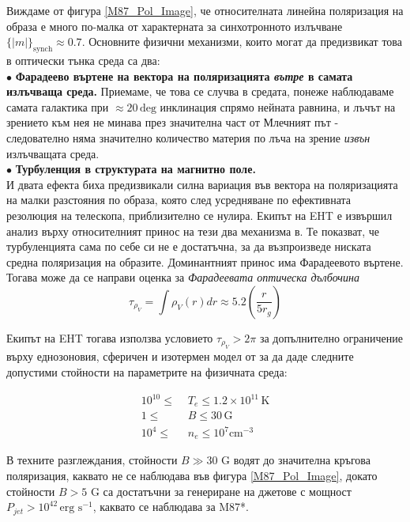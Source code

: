  \noindent Виждаме от фигура \ref{M87_Pol_Image}, че относителната линейна поляризация на образа е много по-малка от характерната за синхотронното излъчване $\lbrace |m| \rbrace_\text{synch}\approx 0.7$. Основните физични механизми, които могат да предизвикат това в оптически тънка среда са два:\\\newline
 $\bullet$ \textbf{Фарадеево въртене на вектора на поляризацията \emph{вътре} в самата излъчваща среда.} Приемаме, че това се случва в средата, понеже наблюдаваме самата галактика при $\approx 20\,\text{deg}$ инклинация спрямо нейната равнина, и лъчът на зрението към нея не минава през значителна част от Млечният път - следователно няма значително количество материя по лъча на зрение \emph{извън} излъчващата среда.\\
 $\bullet$ \textbf{Турбуленция в структурата на магнитно поле.}\\\newline
И двата ефекта биха предизвикали силна вариация във вектора на поляризацията на малки разстояния по образа, която след усредняване по ефективната резолюция на телескопа, приблизително се нулира. Екипът на EHT е извършил анализ върху относителният принос на тези два механизма в. Те показват, че турбуленцията сама по себе си не е достатъчна, за да възпроизведе ниската средна поляризация на образите. Доминантният принос има Фарадеевото въртене. Тогава може да се направи оценка за \emph{Фарадеевата оптическа дълбочина} \cite{EHT_M87_VIII}
\begin{equation}
	\tau_{\rho_V} = \int \rho_{V}(r)dr\approx 5.2\left(\frac{r}{5r_g}\right)
\end{equation}
\lfoot{}

Екипът на EHT тогава използва условието $\tau_{\rho_V}>2\pi$ за допълнително ограничение върху еднозоновия, сферичен и изотермен модел от \cite{EHT_M87_V} за да даде следните допустими стойности на параметрите на физичната среда:

\begin{equation}
	\begin{split}
		10^{10} \le\,\, &T_e \le 1.2 \times 10^{11}\,\text{K}\\
		1 \le\,\, &B \le 30\, \text{G}\\
		10^4 \le\,\, &n_e \le 10^7 \text{cm}^{-3}
	\end{split}
\end{equation}

В техните разглеждания, стойности $B \gg 30$ G водят до значителна кръгова поляризация, каквато не се наблюдава във фигура \ref{M87_Pol_Image}, докато стойности $B > 5$ G са достатъчни за генериране на джетове с мощност $P_{jet} > 10^{42}\,\text{erg s}^{-1}$, каквато се наблюдава за M87*.\\

